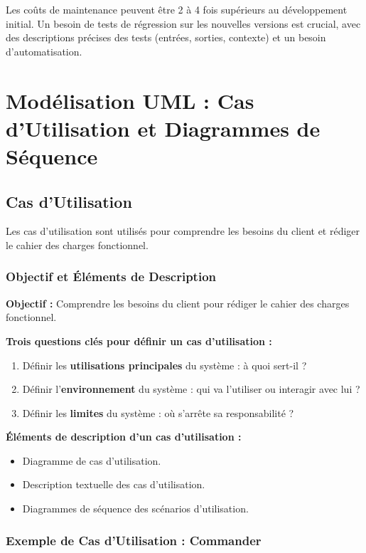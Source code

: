 \documentclass{article}
\begin{document}
\begin{itemize}
Les coûts de maintenance peuvent être 2 à 4 fois supérieurs au développement initial.  Un besoin de tests de régression sur les nouvelles versions est crucial, avec des descriptions précises des tests (entrées, sorties, contexte) et un besoin d'automatisation.

\section{Modélisation UML : Cas d'Utilisation et Diagrammes de Séquence}

\subsection{Cas d'Utilisation}

Les cas d'utilisation sont utilisés pour comprendre les besoins du client et rédiger le cahier des charges fonctionnel.

\subsubsection{Objectif et Éléments de Description}

\textbf{Objectif :} Comprendre les besoins du client pour rédiger le cahier des charges fonctionnel.

\textbf{Trois questions clés pour définir un cas d'utilisation :}

\begin{enumerate}
    \item Définir les \textbf{utilisations principales} du système : à quoi sert-il ?
    \item Définir l'\textbf{environnement} du système : qui va l'utiliser ou interagir avec lui ?
    \item Définir les \textbf{limites} du système : où s'arrête sa responsabilité ?
\end{enumerate}

\textbf{Éléments de description d'un cas d'utilisation :}

\begin{itemize}
    \item Diagramme de cas d'utilisation.
    \item Description textuelle des cas d'utilisation.
    \item Diagrammes de séquence des scénarios d'utilisation.
\end{itemize}

\subsubsection{Exemple de Cas d'Utilisation : Commander}


\end{itemize}
\end{document}
